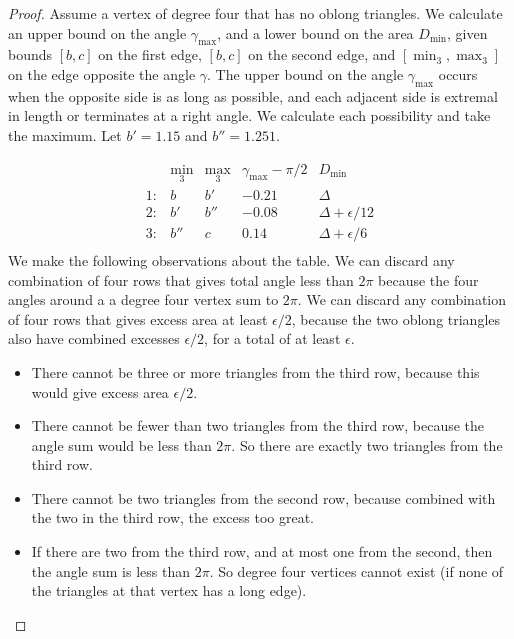 \begin{proof}  Assume a vertex of degree four that has no oblong triangles.
We calculate an upper bound on the angle $\gamma_{\max}$, and a
lower bound on the area $D_{\min}$, given bounds $[b,c]$ on the
first edge, $[b,c]$ on the second edge, and $[\min_3,\max_3]$ on
the edge opposite the angle $\gamma$.  The upper bound on the
angle $\gamma_{\max}$ occurs when the opposite side is as long as
possible, and each adjacent side is extremal in length or
terminates at a right angle.  We calculate each possibility and
take the maximum.  Let $b'=1.15$ and $b''=1.251$.

$$
    \begin{array}{llllll}
      &\min_3&\max_3   &\gamma_{\max} - \pi/2&   D_{\min}\\
    1:&b     &b'       &-0.21              &\Delta\\
    2:&b'    &b''      &-0.08              &\Delta + \epsilon/12\\
    3:&b''   &c        &0.14               &\Delta + \epsilon/6\\
    \end{array}
$$
We make the following observations about the table.  We can
discard any combination of four rows that gives total angle less
than $2\pi$  because the four angles around a a degree four vertex
sum to $2\pi$.  We can discard any combination of four rows that
gives excess area at least $\epsilon/2$, because the two oblong
triangles also have combined excesses $\epsilon/2$, for a total of
at least $\epsilon$.
\begin{itemize}
    \item There cannot be three or more triangles from the third row,
    because this would give excess area $\epsilon/2$.
    \item  There cannot be fewer than two triangles from the third
    row, because the angle sum would be less than $2\pi$. So there
    are exactly two triangles from the third row.
    \item There cannot be two triangles from the second row,
    because combined with the two in the third row, the
    excess too great.
    \item If there are two from the third row, and at most one
    from the second, then the angle sum is less than $2\pi$.  So
    degree four vertices cannot exist (if none of the triangles at
    that vertex has a long edge).
\end{itemize}
\end{proof}

